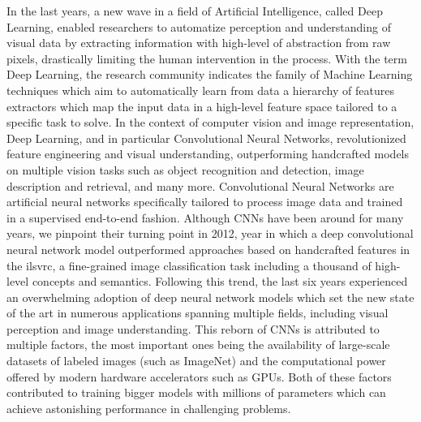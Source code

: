 In the last years, a new wave in a field of Artificial Intelligence, called Deep Learning, enabled researchers to automatize perception and understanding of visual data by extracting information with high-level of abstraction from raw pixels, drastically limiting the human intervention in the process.
With the term Deep Learning, the research community indicates the family of Machine Learning techniques which aim to automatically learn from data a hierarchy of features extractors which map the input data in a high-level feature space tailored to a specific task to solve.
In the context of computer vision and image representation, Deep Learning, and in particular Convolutional Neural Networks, revolutionized feature engineering and visual understanding, outperforming handcrafted models on multiple vision tasks such as object recognition and detection, image description and retrieval,  and many more.
Convolutional Neural Networks are artificial neural networks specifically tailored to process image data and trained in a supervised end-to-end fashion.
Although CNNs have been around for many years, we pinpoint their turning point in 2012, year in which a deep convolutional neural network model outperformed approaches based on handcrafted features in the \acrlong{ilsvrc}, a fine-grained image classification task including a thousand of high-level concepts and semantics.
Following this trend, the last six years experienced an overwhelming adoption of deep neural network models which set the new state of the art in numerous applications spanning multiple fields, including visual perception and image understanding.
This reborn of CNNs is attributed to multiple factors, the most important ones being the availability of large-scale datasets of labeled images (such as ImageNet) and the computational power offered by modern hardware accelerators such as GPUs.
Both of these factors contributed to training bigger models with millions of parameters which can achieve astonishing performance in challenging problems.

